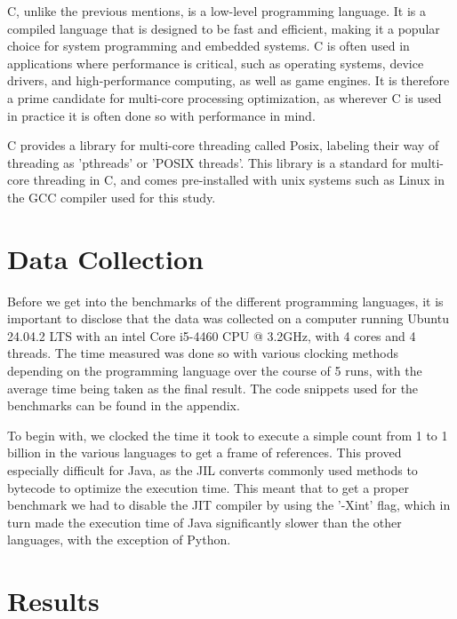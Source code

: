 \documentclass{article}
\begin{document}
C, unlike the previous mentions, is a low-level programming language. It is a compiled language that is designed to be fast and efficient, making it a popular choice for system programming and embedded systems. C is often used in applications where performance is critical, such as operating systems, device drivers, and high-performance computing, as well as game engines. It is therefore a prime candidate for multi-core processing optimization, as wherever C is used in practice it is often done so with performance in mind.

C provides a library for multi-core threading called Posix, labeling their way of threading as 'pthreads' or 'POSIX threads'. This library is a standard for multi-core threading in C, and comes pre-installed with unix systems such as Linux in the GCC compiler used for this study.

\section{Data Collection}

Before we get into the benchmarks of the different programming languages, it is important to disclose that the data was collected on a computer running Ubuntu 24.04.2 LTS with an intel Core i5-4460 CPU @ 3.2GHz, with 4 cores and 4 threads. The time measured was done so with various clocking methods depending on the programming language over the course of 5 runs, with the average time being taken as the final result. The code snippets used for the benchmarks can be found in the appendix.

To begin with, we clocked the time it took to execute a simple count from 1 to 1 billion in the various languages to get a frame of references. This proved especially difficult for Java, as the JIL converts commonly used methods to bytecode to optimize the execution time. This meant that to get a proper benchmark we had to disable the JIT compiler by using the '-Xint' flag, which in turn made the execution time of Java significantly slower than the other languages, with the exception of Python.

\clearpage
\section{Results}
\end{document}
